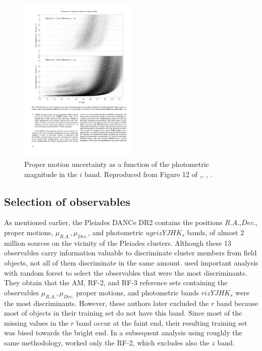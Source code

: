 \begin{figure}[ht!]
\begin{center}
\includegraphics[height=8cm]{background/Figures/F12_Bouy2013.pdf}
\caption{Proper motion uncertainty as a function of the photometric magnitude in the $i$ band. Reproduced from Figure 12 of \citet{Bouy2013},\textit{}, , .}
\label{fig:pmuncert}
\end{center}
\end{figure}

\subsection{Selection of observables}
\label{sect:RF-2}
\sloppy
As mentioned earlier, the Pleiades DANCe DR2 contains the positions $R.A.$,$Dec.$, proper motions, $\mu_{R.A.},\mu_{Dec.}$, and photometric $ugrizYJHK_s$ bands, of almost 2 million sources on the vicinity of the Pleiades clusters. Although these 13 observables carry information valuable to discriminate cluster members from field objects, not all of them discriminate in the same amount. \citet{Sarro2014} used important analysis with random forest to select the observables that were the most discriminants. They obtain that the AM, RF-2, and RF-3 reference sets containing the observables $\mu_{R.A.},\mu_{Dec.}$ proper motions, and photometric bands $rizYJHK_s$ were the most discriminants. However, these authors later excluded the $r$ band because most of objects in their training set do not have this band. Since most of the missing values in the $r$ band occur at the faint end, their resulting training set was bised towards the bright end. In a subsequent analysis using roughly the same methodology, \citet{Bouy2015} worked only the RF-2, which excludes also the $z$ band.

